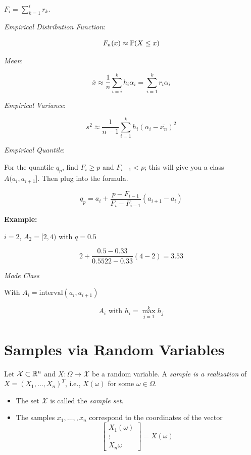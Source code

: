 \(F_i = \sum_{k = 1}^{i} r_k\).

\emph{Empirical Distribution Function}:

\[
    F_n(x) \approx \mathbb{P}(X \le x)
\]

\emph{Mean}:

\[
    \overline{x} \approx \frac{1}{n} \sum_{i = i}^{k} h_i \alpha_i = \sum_{i = 1}^{k}r_i \alpha_i
\]

\emph{Empirical Variance}:

\[
    s^2 \approx \frac{1}{n - 1}\sum_{i = 1}^{k} h_i (\alpha_i - \overline{x_n})^2
\]

\emph{Empirical Quantile}:

For the quantile \(q_p\), find \(F_i \ge p\) and \(F_{i  - 1} < p\); this will give you a class 
\(A(a_i, a_{i + 1}]\). Then plug into the formula.

\[
    q_p = a_i + \frac{p - F_{i - 1}}{F_i - F_{i - 1}}(a_{i + 1} - a_i)
\]

\textbf{Example:}

\(i = 2\), \(A_{2} = [2,4)\) with \(q = 0.5\)

\[
    2 + \frac{0.5 - 0.33}{0.5522 - 0.33}(4 - 2) = 3.53
\]


\emph{Mode Class}

With \(A_i = \text{interval}(a_i, a_{i + 1})\) 

\[
    A_i \text{ with } h_i = \max_{j = 1}^{k} h_j
\]

\section{Samples via Random Variables}

Let \(\mathcal{X} \subset \mathbb{R}^{n}\) and \(X : \Omega \to \mathcal{X}\) be a 
random variable.  A \emph{sample is a realization} of \(X = (X_{1}, \ldots, X_{n})^{T}\), i.e., \(X(\omega)\) for some \(\omega \in \Omega\).

\begin{itemize}

    \item The set \(\mathcal{X}\) is called the \emph{sample set}.

    \item The samples \(x_1, \dots,,x_n\) correspond to the coordinates of the vector
    \[
        \begin{bmatrix}
            X_1(\omega) \\ 
            \vdots \\ 
            X_n{\omega}
        \end{bmatrix} 
        = 
        X(\omega)
    \]

\end{itemize}

